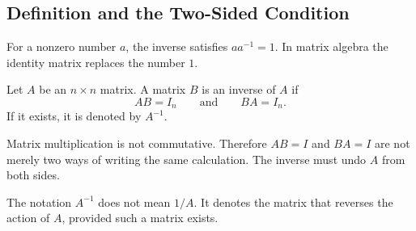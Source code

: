 \subsection{Definition and the Two-Sided Condition}

For a nonzero number $a$, the inverse satisfies $aa^{-1}=1$. In matrix algebra the identity matrix replaces the number $1$.

\begin{definitionbox}
Let $A$ be an $n\times n$ matrix. A matrix $B$ is an inverse of $A$ if
\[
AB=I_n
\qquad\text{and}\qquad
BA=I_n.
\]
If it exists, it is denoted by $A^{-1}$.
\end{definitionbox}

\begin{corebox}
Matrix multiplication is not commutative. Therefore $AB=I$ and $BA=I$ are not merely two ways of writing the same calculation. The inverse must undo $A$ from both sides.
\end{corebox}

\begin{remarkbox}
The notation $A^{-1}$ does not mean $1/A$. It denotes the matrix that reverses the action of $A$, provided such a matrix exists.
\end{remarkbox}
